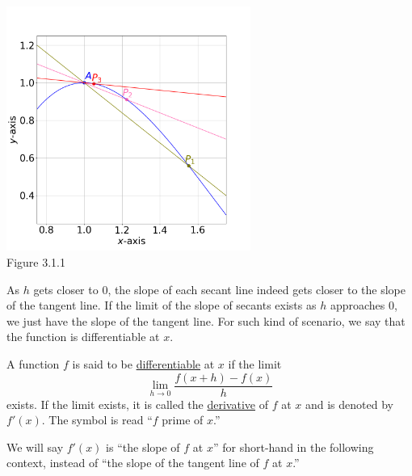 \documentclass[11pt]{book}
\theoremstyle{break}
\theoremstyle{no_label}
\newcommand{\figtag}[1]{\\[-1.2em]Figure {#1}}
\numberwithin{equation}{section}
\begin{document}
\begin{center}
    \includegraphics[width=0.6\textwidth]{sec_to_tan.png}\figtag{3.1.1}
\end{center}

As $h$ gets closer to $0$, the slope of each secant line indeed gets closer to the slope of the tangent line. If the limit of the slope of secants exists as $h$ approaches $0$, we just have the slope of the tangent line. For such kind of scenario, we say that the function is differentiable at $x$.

\begin{definition}
    A function $f$ is said to be \underline{differentiable} at $x$ if the limit $$\lim_{h\to 0}\dfrac{f(x+h)-f(x)}{h}$$ exists. If the limit exists, it is called the \underline{derivative} of $f$ at $x$ and is denoted by $f'(x)$. The symbol is read ``$f$ prime of $x$.''
\end{definition}

\begin{remark}
    We will say $f'(x)$ is ``the slope of $f$ at $x$'' for short-hand in the following context, instead of ``the slope of the tangent line of $f$ at $x$.''
\end{remark}
\end{document}
